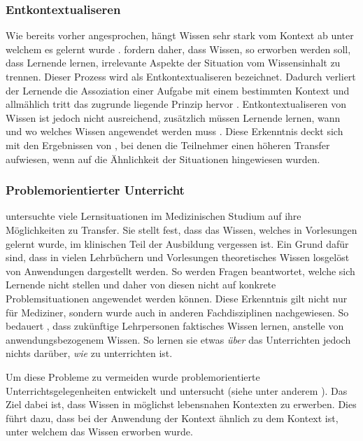 \subsubsection{Entkontextualiseren}

Wie bereits vorher angesprochen, hängt Wissen sehr stark vom Kontext ab unter welchem es gelernt wurde \citep{Godden1975,Schoenfeld1988}. \citet{Anderson1996} fordern daher, dass Wissen, so erworben werden soll, dass Lernende lernen, irrelevante Aspekte der Situation vom Wissensinhalt zu trennen. Dieser Prozess wird als Entkontextualiseren bezeichnet. Dadurch verliert der Lernende die Assoziation einer Aufgabe mit einem bestimmten Kontext und allmählich tritt das zugrunde liegende Prinzip hervor \citet{Perkins1989}. Entkontextualiseren von Wissen ist jedoch nicht ausreichend, zusätzlich müssen Lernende lernen, wann und wo welches Wissen angewendet werden muss \citet{Wiggins1993}. Diese Erkenntnis deckt sich mit den Ergebnissen von \citet{Gick1980}, bei denen die Teilnehmer einen höheren Transfer aufwiesen, wenn auf die Ähnlichkeit der Situationen hingewiesen wurden.


\subsubsection{Problemorientierter Unterricht}

\citet{Williams1992} untersuchte viele Lernsituationen im Medizinischen Studium auf ihre Möglichkeiten zu Transfer. Sie stellt fest, dass das Wissen, welches in Vorlesungen gelernt wurde, im klinischen Teil der Ausbildung vergessen ist. Ein Grund dafür sind, dass in vielen Lehrbüchern und Vorlesungen theoretisches Wissen losgelöst von Anwendungen dargestellt werden. So werden Fragen beantwortet, welche sich Lernende nicht stellen und daher von diesen nicht auf konkrete Problemsituationen angewendet werden können.
Diese Erkenntnis gilt nicht nur für Mediziner, sondern wurde auch in anderen Fachdisziplinen nachgewiesen. So bedauert \citet{Shuell1996}, dass zukünftige Lehrpersonen faktisches Wissen lernen, anstelle von anwendungsbezogenem Wissen. So lernen sie etwas \textit{über} das Unterrichten jedoch nichts darüber, \textit{wie} zu unterrichten ist.

Um diese Probleme zu vermeiden wurde problemorientierte Unterrichtsgelegenheiten entwickelt und untersucht (siehe unter anderem \citet{Barrows1985,Michael1993,Shuell1996,Corte2003,Reusser2005,Fassler2007,Pea2013b}). Das Ziel dabei ist, dass Wissen in möglichst lebensnahen Kontexten zu erwerben. Dies führt dazu, dass bei der Anwendung der Kontext ähnlich zu dem Kontext ist, unter welchem das Wissen erworben wurde.

